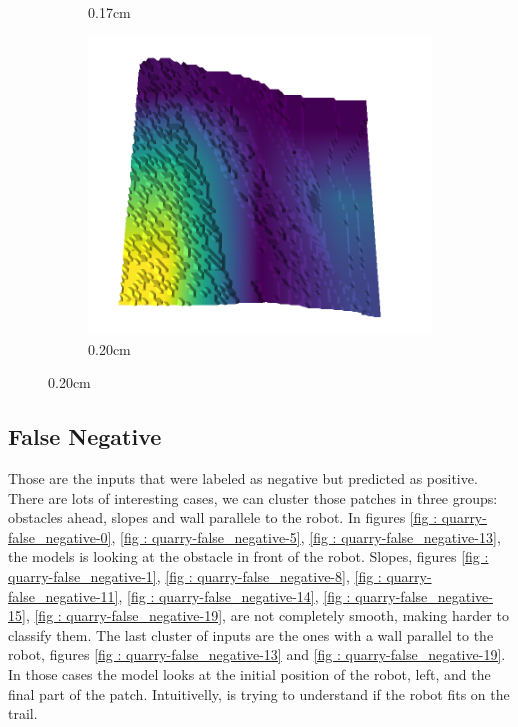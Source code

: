\documentclass[../document.tex]{subfiles}
\begin{document}
\begin{figure}[H]
\begin{subfigure}[b]{0.192\linewidth}
    \caption{0.17cm}
    \label{fig : quarry-worst-19}
    \end{subfigure}
    \begin{subfigure}[b]{0.192\linewidth}
    \includegraphics[width=\linewidth]{../img/5/quarry/worst/19-patch-3d-majavi-colormap-200.png}
    \caption{0.20cm}
    \label{fig : quarry-worst-20}
    \end{subfigure}
    \label{fig : quarry-worst}
    \end{figure}

\subsection{False Negative}
Those are the inputs that were labeled as negative but predicted as positive. There are lots of interesting cases, we can cluster those patches in three groups: obstacles ahead, slopes and wall parallele to the robot. In figures \ref{fig : quarry-false_negative-0}, \ref{fig : quarry-false_negative-5}, \ref{fig : quarry-false_negative-13}, the models is looking at the obstacle in front of the robot.  Slopes, figures \ref{fig : quarry-false_negative-1}, \ref{fig : quarry-false_negative-8}, \ref{fig : quarry-false_negative-11}, \ref{fig : quarry-false_negative-14}, \ref{fig : quarry-false_negative-15}, \ref{fig : quarry-false_negative-19}, are not completely smooth, making harder to classify them. The last cluster of inputs are the ones with a wall parallel to the robot, figures \ref{fig : quarry-false_negative-13} and \ref{fig : quarry-false_negative-19}. In those cases the model looks at the initial position of the robot, left, and the final part of the patch. Intuitivelly, is trying to understand if the robot fits on the trail. 
\end{document}
